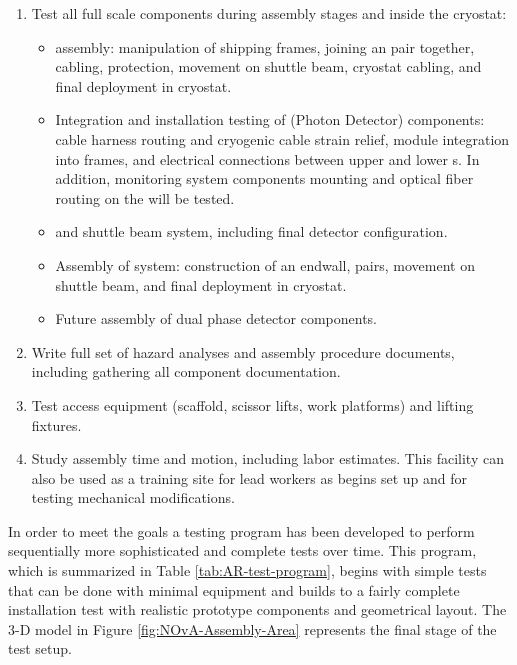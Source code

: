 \begin{enumerate}
\item Test all full scale  components during assembly stages and inside the cryostat:  
\begin{itemize}
    \item {}  assembly: manipulation of  shipping frames, joining an  pair together,  cabling,  protection, movement on shuttle beam, cryostat cabling, and final deployment in cryostat. 
    \item Integration and installation testing of  (Photon Detector) components: cable harness routing and cryogenic cable strain relief, module integration into  frames, and electrical connections between upper and lower s.  In addition,  monitoring system components mounting and optical fiber routing on the  will be tested.
    \item {} and shuttle beam system, including final detector configuration.
    \item Assembly of  system: construction of an endwall,  pairs, movement on shuttle beam, and final deployment in cryostat.
    \item Future assembly of dual phase detector components.
\end{itemize}
\item Write full set of hazard analyses and assembly procedure documents, including gathering all component documentation. 
\item Test access equipment (scaffold, scissor lifts, work platforms) and lifting fixtures. 
\item Study assembly time and motion, including labor estimates. This facility can also be used as a training site for lead workers as  begins set up and for testing mechanical modifications.
\end{enumerate}

In order to meet the goals a testing program has been developed to perform sequentially more sophisticated and complete tests over time. 
This program, which is summarized in Table \ref{tab:AR-test-program}, begins with simple tests that can be done with minimal equipment and builds to a fairly complete installation test with realistic prototype components and geometrical layout. 
The 3-D model in Figure \ref{fig:NOvA-Assembly-Area} represents the final stage of the test setup.

